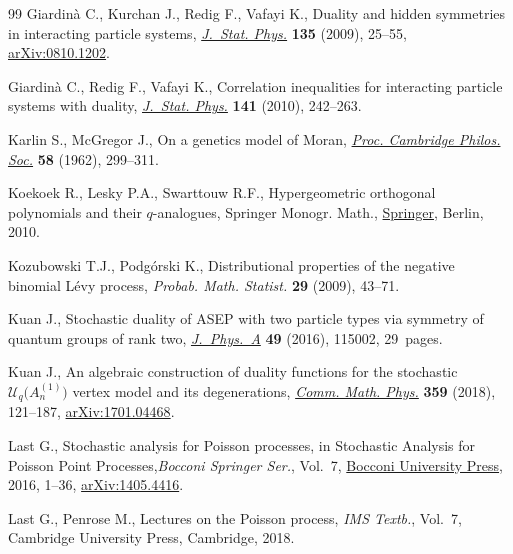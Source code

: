 \begin{thebibliography}{99}
Giardin\`a C., Kurchan J., Redig F., Vafayi K., Duality and hidden symmetries
 in interacting particle systems, \href{https://doi.org/10.1007/s10955-009-9716-2}{\textit{J.~Stat. Phys.}} \textbf{135} (2009),
 25--55, \href{https://arxiv.org/abs/0810.1202}{arXiv:0810.1202}.

Giardin\`a C., Redig F., Vafayi K., Correlation inequalities for interacting
 particle systems with duality, \href{https://doi.org/10.1007/s10955-010-0055-0}{\textit{J.~Stat. Phys.}} \textbf{141} (2010),
 242--263.

Karlin S., McGregor J., On a genetics model of {M}oran, \href{https://doi.org/10.1017/S0305004100036513}{\textit{Proc. Cambridge
 Philos. Soc.}} \textbf{58} (1962), 299--311.

Koekoek R., Lesky P.A., Swarttouw R.F., Hypergeometric orthogonal polynomials
 and their {$q$}-analogues, Springer Monogr. Math., \href{https://doi.org/10.1007/978-3-642-05014-5}{Springer}, Berlin, 2010.

Kozubowski T.J., Podg\'orski K., Distributional properties of the negative
 binomial {L}\'evy process, \textit{Probab. Math. Statist.} \textbf{29}
 (2009), 43--71.

Kuan J., Stochastic duality of {ASEP} with two particle types via symmetry of
 quantum groups of rank two, \href{https://doi.org/10.1088/1751-8113/49/11/115002}{\textit{J.~Phys.~A}} \textbf{49} (2016), 115002,
 29~pages.

Kuan J., An algebraic construction of duality functions for the stochastic
 {$\mathcal{U}_q\bigl( A_n^{(1)}\bigr)$} vertex model and its degenerations,
 \href{https://doi.org/10.1007/s00220-018-3108-x}{\textit{Comm. Math. Phys.}} \textbf{359} (2018), 121--187,
 \href{https://arxiv.org/abs/1701.04468}{arXiv:1701.04468}.

Last G., Stochastic analysis for {P}oisson processes, in Stochastic Analysis
 for {P}oisson Point Processes,\textit{Bocconi Springer Ser.}, Vol.~7,
 \href{https://doi.org/10.1007/978-3-319-05233-5_1}{Bocconi University Press}, 2016, 1--36, \href{https://arxiv.org/abs/1405.4416}{arXiv:1405.4416}.

Last G., Penrose M., Lectures on the {P}oisson process, \textit{IMS Textb.},
 Vol.~7, Cambridge University Press, Cambridge, 2018.


\end{thebibliography}
